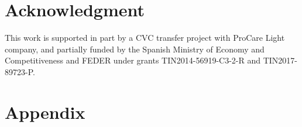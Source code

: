 \documentclass[10pt,a4paper,twocolumn,twoside]{article}
\begin{document}
\section{Acknowledgment}
This work is supported in part by a CVC transfer project with ProCare Light company, and partially funded by the Spanish Ministry of Economy and Competitiveness and FEDER under grants TIN2014-56919-C3-2-R and TIN2017-89723-P.




\appendix

\section*{Appendix}
\end{document}
